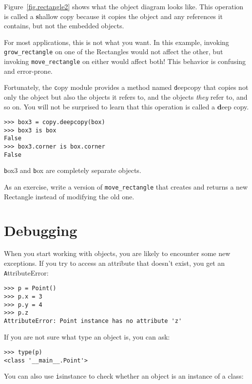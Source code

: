 \documentclass[
DIV=11,
fontsize=12,
twoside,
headinclude=false,
titlepage=firstiscover,
abstract=true,
headsepline=true,
footsepline=true,
chapterprefix=true, %
headings=big,
bibliography=totoc,%
captions=tableheading
]{scrbook}
\theoremstyle{definition}
\begin{document}
Figure~\ref{fig.rectangle2} shows what the object diagram looks like.
This operation is called a {\textbf shallow copy} because it copies the
object and any references it contains, but not the embedded objects.

For most applications, this is not what you want.  In this example,
invoking \verb"grow_rectangle" on one of the Rectangles would not
affect the other, but invoking \verb"move_rectangle" on either would
affect both!  This behavior is confusing and error-prone.

Fortunately, the {\texttt copy} module provides a method named {\texttt
deepcopy} that copies not only the object but also 
the objects it refers to, and the objects {\em they} refer to,
and so on.
You will not be surprised to learn that this operation is
called a {\textbf deep copy}.

\begin{lstlisting}
>>> box3 = copy.deepcopy(box)
>>> box3 is box
False
>>> box3.corner is box.corner
False
\end{lstlisting}
%
{\texttt box3} and {\texttt box} are completely separate objects.

As an exercise, write a version of \verb"move_rectangle" that creates and
returns a new Rectangle instead of modifying the old one.


\section{Debugging}
\label{hasattr}

When you start working with objects, you are likely to encounter
some new exceptions.  If you try to access an attribute
that doesn't exist, you get an {\texttt AttributeError}:

\begin{lstlisting}
>>> p = Point()
>>> p.x = 3
>>> p.y = 4
>>> p.z
AttributeError: Point instance has no attribute 'z'
\end{lstlisting}
%
If you are not sure what type an object is, you can ask:

\begin{lstlisting}
>>> type(p)
<class '__main__.Point'>
\end{lstlisting}
%
You can also use {\texttt isinstance} to check whether an object
is an instance of a class:
\end{document}
